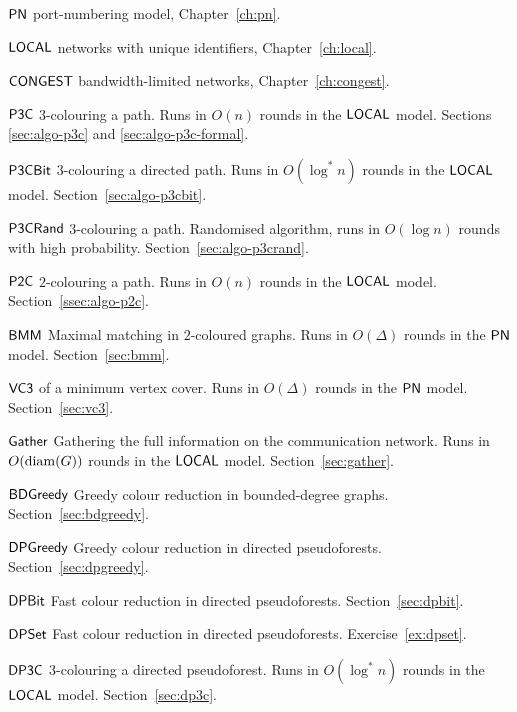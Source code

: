 
{\raggedright
\begin{notation}
    \item[$\textup{\sffamily PN}$] port-numbering model, Chapter~\ref{ch:pn}.
    \item[$\textup{\sffamily LOCAL}$] networks with unique identifiers, Chapter~\ref{ch:local}.
    \item[$\textup{\sffamily CONGEST}$] bandwidth-limited networks, Chapter~\ref{ch:congest}.
\end{notation}}


{\raggedright
\begin{algorithms}
    \item[$\textup{\sffamily P3C}$] $3$-colouring a path. Runs in $O(n)$ rounds in the $\textup{\sffamily LOCAL}$ model. Sections \ref{sec:algo-p3c} and \ref{sec:algo-p3c-formal}.
    \item[$\textup{\sffamily P3CBit}$] $3$-colouring a directed path. Runs in $O(\log^* n)$ rounds in the $\textup{\sffamily LOCAL}$ model. Section~\ref{sec:algo-p3cbit}.
    \item[$\textup{\sffamily P3CRand}$] $3$-colouring a path. Randomised algorithm, runs in $O(\log n)$ rounds with high probability. Section~\ref{sec:algo-p3crand}.
    \item[$\textup{\sffamily P2C}$] $2$-colouring a path. Runs in $O(n)$ rounds in the $\textup{\sffamily LOCAL}$ model. Section~\ref{ssec:algo-p2c}.
    \item[$\textup{\sffamily BMM}$] Maximal matching in $2$-coloured graphs. Runs in $O(\Delta)$ rounds in the $\textup{\sffamily PN}$ model. Section~\ref{sec:bmm}.
    \item[$\textup{\sffamily VC3}$]  of a minimum vertex cover. Runs in $O(\Delta)$ rounds in the $\textup{\sffamily PN}$ model. Section~\ref{sec:vc3}.
    \item[$\textup{\sffamily Gather}$] Gathering the full information on the communication network. Runs in $O(\operatorname{diam}(G))$ rounds in the $\textup{\sffamily LOCAL}$ model. Section~\ref{sec:gather}.
    \item[$\textup{\sffamily BDGreedy}$] Greedy colour reduction in bounded-degree graphs. Section~\ref{sec:bdgreedy}.
    \item[$\textup{\sffamily DPGreedy}$] Greedy colour reduction in directed pseudoforests. Section~\ref{sec:dpgreedy}.
    \item[$\textup{\sffamily DPBit}$] Fast colour reduction in directed pseudoforests. Section~\ref{sec:dpbit}.
    \item[$\textup{\sffamily DPSet}$] Fast colour reduction in directed pseudoforests. Exercise~\ref{ex:dpset}.
    \item[$\textup{\sffamily DP3C}$] $3$-colouring a directed pseudoforest. Runs in $O(\log^* n)$ rounds in the $\textup{\sffamily LOCAL}$ model. Section~\ref{sec:dp3c}.

\end{algorithms}}
